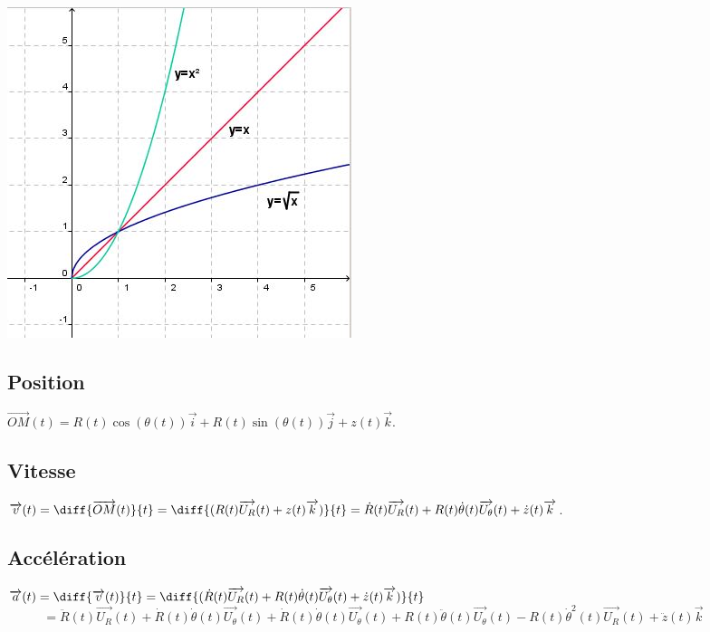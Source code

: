 \documentclass[a4paper,10pt]{book} %
\begin{document}
\begin{center} \includegraphics[scale=0.45]{images/002.png} \end{center}

\subsection{Position}
$\overrightarrow{OM}(t)=R(t)\cos(\theta(t))\overrightarrow{i}+R(t)\sin(\theta(t))\overrightarrow{j}+z(t)\overrightarrow{k}$.

\subsection{Vitesse}
$\overrightarrow{v}(t)=\diff{\overrightarrow{OM}(t)}{t}=\diff{(R(t)\overrightarrow{U_R}(t)+z(t)\overrightarrow{k})}{t}=\dot{R}(t)\overrightarrow{U_R}(t)+R(t)\dot{\theta}(t)\overrightarrow{U_\theta}(t)+\dot{z}(t)\overrightarrow{k}$.

\subsection{Accélération}
$\overrightarrow{a}(t)=\diff{\overrightarrow{v}(t)}{t}=\diff{(\dot{R}(t)\overrightarrow{U_R}(t)+R(t)\dot{\theta}(t)\overrightarrow{U_\theta}(t)+\dot{z}(t)\overrightarrow{k})}{t}$\\

$\phantom{\overrightarrow{a}(t)}=\ddot{R}(t)\overrightarrow{U_R}(t)+\dot{R}(t)\dot{\theta}(t)\overrightarrow{U_\theta}(t)+\dot{R}(t)\dot{\theta}(t)\overrightarrow{U_\theta}(t)+R(t)\ddot{\theta}(t)\overrightarrow{U_\theta}(t)-R(t)\dot{\theta}^2(t)\overrightarrow{U_R}(t)+\ddot{z}(t)\overrightarrow{k}$\\
\end{document}
